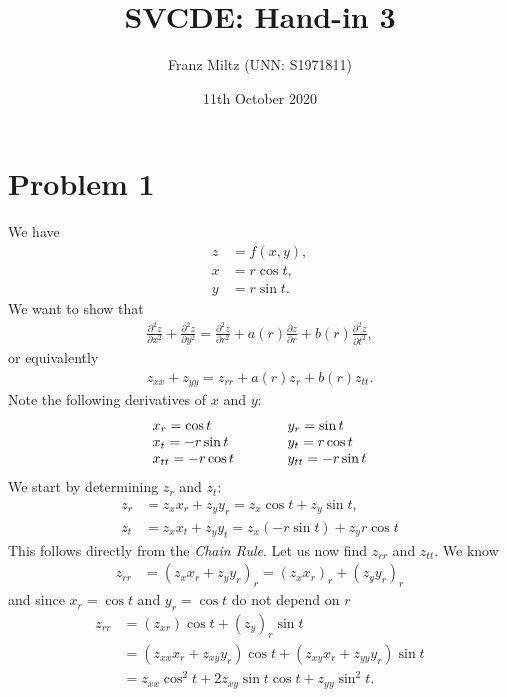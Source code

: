 \documentclass{article}
\title{SVCDE: Hand-in 3}
\author{Franz Miltz (UNN: S1971811)}
\newcommand{\p}{\partial }
\begin{document}
\date{11th October 2020}
\maketitle
\section*{Problem 1}
We have
\begin{align*}
  z &= f(x,y),\\
  x &= r\cos t,\\
  y &= r\sin t.
\end{align*}
We want to show that
\begin{align*}
  \frac{\p^2 z}{\p x^2}+\frac{\p^2 z}{\p y^2}
  = \frac{\p^2 z}{\p r^2}+a(r)\frac{\p z}{\p r}+b(r)\frac{\p^2 z}{\p t^2},
\end{align*}
or equivalently
\begin{align}
  \label{eq1}
  z_{xx} + z_{yy} = z_{rr} + a(r)z_r + b(r)z_{tt}.
\end{align}
Note the following derivatives of $x$ and $y$:
\begin{align*}
  \begin{array}{l l}
  x_r = \cos t &\hspace{1cm} y_r = \sin t\\
  x_t = -r\sin t &\hspace{1cm} y_t = r\cos t\\
  x_{tt} = -r\cos t &\hspace{1cm} y_{tt} = -r\sin t
  \end{array}
\end{align*}
We start by determining $z_r$ and $z_t$:
\begin{align*}
  z_r &= z_x x_r + z_y y_r = z_x \cos t + z_y \sin t,\\
  z_t &= z_x x_t + z_y y_t = z_x (-r\sin t) + z_y r\cos t
\end{align*}
This follows directly from the \emph{Chain Rule}. 
Let us now find $z_{rr}$ and $z_{tt}$. We know
\begin{align*}
    z_{rr} &= (z_x x_r + z_y y_r)_r = (z_x x_r)_r + (z_y y_r)_r
\end{align*}
and since $x_r = \cos t$ and $y_r = \cos t$ do not depend on $r$
\begin{align*}
  z_{rr} &= (z_{xr})\cos t + (z_y)_r \sin t \\
  &=(z_{xx}x_r + z_{xy}y_r)\cos t + (z_{xy}x_r + z_{yy}y_r)\sin t\\
  &=z_{xx}\cos^2 t + 2 z_{xy}\sin t\cos t + z_{yy}\sin^2 t.
\end{align*}
\end{document}
